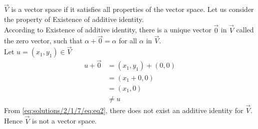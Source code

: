 $\vec{V}$ is a vector space if it satisfies all properties of the vector space. Let us consider the property of Existence of additive identity.\\
According to Existence of additive identity, there is a unique vector $\vec{0}$ in $\vec{V}$ called the zero vector, such that $\alpha + \vec{0} = \alpha$ for all $\alpha$ in $\vec{V}$.\\
Let $u = (x_1, y_1) \in \vec{V}$
\begin{equation} \label{eq:solutions/2/1/7/eq:eq2}
\begin{split}
u+\vec{0} & = (x_1, y_1) + (0, 0)\\
 & = (x_1+ 0, 0)\\
& = (x_1, 0)\\
&\not= u
\end{split}
\end{equation}
From \eqref{eq:solutions/2/1/7/eq:eq2}, there does not exist an additive identity for $\vec{V}$.\\
Hence $\vec{V}$ is not a vector space.
